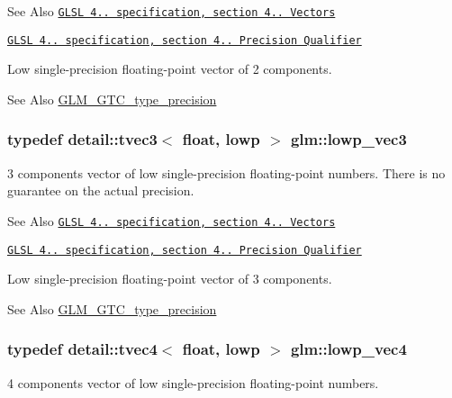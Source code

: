 \begin{DoxySeeAlso}{See Also}
\href{http://www.opengl.org/registry/doc/GLSLangSpec.4.20.8.pdf}{\tt G\-L\-S\-L 4.. specification, section 4.. Vectors} 

\href{http://www.opengl.org/registry/doc/GLSLangSpec.4.20.8.pdf}{\tt G\-L\-S\-L 4.. specification, section 4.. Precision Qualifier}
\end{DoxySeeAlso}
Low single-\/precision floating-\/point vector of 2 components. \begin{DoxySeeAlso}{See Also}
\hyperlink{group__gtc__type__precision}{G\-L\-M\-\_\-\-G\-T\-C\-\_\-type\-\_\-precision} 
\end{DoxySeeAlso}
\hypertarget{group__core__precision_ga062795097526e2758d34cb38387dd82d}{
\subsubsection[{lowp\-\_\-vec3}]{\setlength{\rightskip}{0pt plus 5cm}typedef detail\-::tvec3$<$ float, lowp $>$ {\bf glm\-::lowp\-\_\-vec3}}}\label{group__core__precision_ga062795097526e2758d34cb38387dd82d}
3 components vector of low single-\/precision floating-\/point numbers. There is no guarantee on the actual precision.

\begin{DoxySeeAlso}{See Also}
\href{http://www.opengl.org/registry/doc/GLSLangSpec.4.20.8.pdf}{\tt G\-L\-S\-L 4.. specification, section 4.. Vectors} 

\href{http://www.opengl.org/registry/doc/GLSLangSpec.4.20.8.pdf}{\tt G\-L\-S\-L 4.. specification, section 4.. Precision Qualifier}
\end{DoxySeeAlso}
Low single-\/precision floating-\/point vector of 3 components. \begin{DoxySeeAlso}{See Also}
\hyperlink{group__gtc__type__precision}{G\-L\-M\-\_\-\-G\-T\-C\-\_\-type\-\_\-precision} 
\end{DoxySeeAlso}
\hypertarget{group__core__precision_ga706ad1296c1cdcbd26c815fbb0f3f846}{
\subsubsection[{lowp\-\_\-vec4}]{\setlength{\rightskip}{0pt plus 5cm}typedef detail\-::tvec4$<$ float, lowp $>$ {\bf glm\-::lowp\-\_\-vec4}}}\label{group__core__precision_ga706ad1296c1cdcbd26c815fbb0f3f846}
4 components vector of low single-\/precision floating-\/point numbers.

